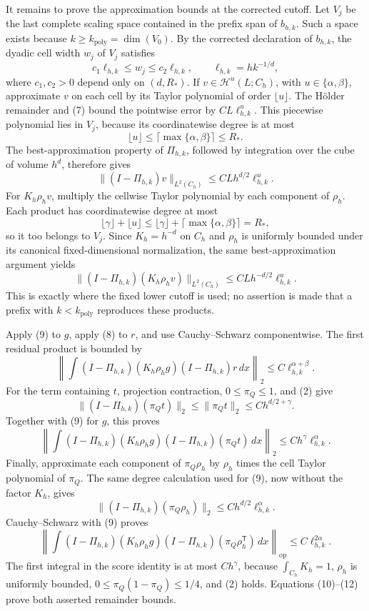 It remains to prove the approximation bounds at the corrected cutoff.  Let \(V_j\) be the last complete scaling space contained in the prefix span of \(b_{h,k}\).  Such a space exists because \(k\ge k_{\mathrm{poly}}=\dim(V_0)\).  By the corrected declaration of \(b_{h,k}\), the dyadic cell width \(w_j\) of \(V_j\) satisfies
\[
 c_1\ell_{h,k}\le w_j\le c_2\ell_{h,k},
 \qquad \ell_{h,k}=hk^{-1/d},
\tag{7}
\]
where \(c_1,c_2>0\) depend only on \((d,R_*)\).  If \(v\in\mathcal H^u(L;C_h)\), with \(u\in\{\alpha,\beta\}\), approximate \(v\) on each cell by its Taylor polynomial of order \(\lfloor u\rfloor\).  The H\"older remainder and (7) bound the pointwise error by \(CL\ell_{h,k}^u\).  This piecewise polynomial lies in \(V_j\), because its coordinatewise degree is at most
\[
 \lfloor u\rfloor\le\lceil\max\{\alpha,\beta\}\rceil\le R_*.
\]
The best-approximation property of \(\Pi_{h,k}\), followed by integration over the cube of volume \(h^d\), therefore gives
\[
 \lVert(I-\Pi_{h,k})v\rVert_{L^2(C_h)}
 \le CLh^{d/2}\ell_{h,k}^u.
\tag{8}
\]
For \(K_h\rho_hv\), multiply the cellwise Taylor polynomial by each component of \(\rho_h\).  Each product has coordinatewise degree at most
\[
 \lfloor\gamma\rfloor+\lfloor u\rfloor
 \le\lfloor\gamma\rfloor+\lceil\max\{\alpha,\beta\}\rceil=R_*,
\]
so it too belongs to \(V_j\).  Since \(K_h=h^{-d}\) on \(C_h\) and \(\rho_h\) is uniformly bounded under its canonical fixed-dimensional normalization, the same best-approximation argument yields
\[
 \lVert(I-\Pi_{h,k})(K_h\rho_hv)\rVert_{L^2(C_h)}
 \le CLh^{-d/2}\ell_{h,k}^u.
\tag{9}
\]
This is exactly where the fixed lower cutoff is used; no assertion is made that a prefix with \(k<k_{\mathrm{poly}}\) reproduces these products.

Apply (9) to \(g\), apply (8) to \(r\), and use Cauchy--Schwarz componentwise.  The first residual product is bounded by
\[
 \left\lVert\int (I-\Pi_{h,k})(K_h\rho_hg)
                  (I-\Pi_{h,k})r\,dx\right\rVert_2
 \le C\ell_{h,k}^{\alpha+\beta}.
\tag{10}
\]
For the term containing \(t\), projection contraction, \(0\le\pi_Q\le1\), and (2) give
\[
 \lVert(I-\Pi_{h,k})(\pi_Qt)\rVert_2
 \le\lVert\pi_Qt\rVert_2\le Ch^{d/2+\gamma}.
\]
Together with (9) for \(g\), this proves
\[
 \left\lVert\int (I-\Pi_{h,k})(K_h\rho_hg)
                  (I-\Pi_{h,k})(\pi_Qt)\,dx\right\rVert_2
 \le Ch^\gamma\ell_{h,k}^\alpha.
\tag{11}
\]
Finally, approximate each component of \(\pi_Q\rho_h\) by \(\rho_h\) times the cell Taylor polynomial of \(\pi_Q\).  The same degree calculation used for (9), now without the factor \(K_h\), gives
\[
 \lVert(I-\Pi_{h,k})(\pi_Q\rho_h)\rVert_2
 \le Ch^{d/2}\ell_{h,k}^\alpha.
\]
Cauchy--Schwarz with (9) proves
\[
 \left\lVert\int (I-\Pi_{h,k})(K_h\rho_hg)
                  (I-\Pi_{h,k})(\pi_Q\rho_h^{\mathsf T})\,dx
 \right\rVert_{\mathrm{op}}
 \le C\ell_{h,k}^{2\alpha}.
\tag{12}
\]
The first integral in the score identity is at most \(Ch^\gamma\), because \(\int_{C_h}K_h=1\), \(\rho_h\) is uniformly bounded, \(0\le\pi_Q(1-\pi_Q)\le1/4\), and (2) holds.  Equations (10)--(12) prove both asserted remainder bounds.

